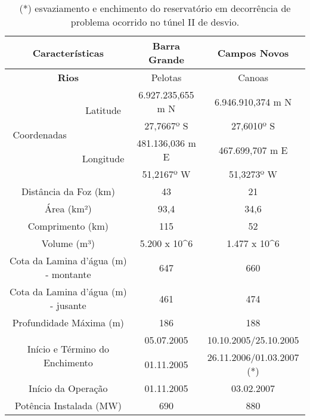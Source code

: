     \begin{table}
\centering
\begin{tabular}{|c|c|c|c|}
\hline
\multicolumn{2}{|c|}{\textbf{Características}} & \textbf{Barra Grande} & \textbf{Campos Novos} \\
\hline
\multicolumn{2}{|c|}{\textbf{Rios}} & Pelotas & Canoas \\
\hline
    \multirow{4}{*}{Coordenadas}
        & \multirow{2}{*}{Latitude}
            & 6.927.235,655 m N & 6.946.910,374 m N \\
            \cline{3-4}
            && 27,7667º S & 27,6010º S\\
            \cline{2-4}
        & \multirow{2}{*}{Longitude}
            & 481.136,036 m E & 467.699,707 m E \\
            \cline{3-4}
            && 51,2167º W & 51,3273º W \\
\hline
\multicolumn{2}{|c|}{Distância da Foz (km)} & 43 &  21 \\ \hline
\multicolumn{2}{|c|}{Área (km²)} & 93,4 &  34,6 \\ \hline
\multicolumn{2}{|c|}{Comprimento (km)} & 115 &  52 \\ \hline
\multicolumn{2}{|c|}{Volume (m³)} & 5.200 x 10^6 &  1.477 x 10^6 \\ \hline
\multicolumn{2}{|c|}{Cota da Lamina d'água (m) - montante} & 647 &  660 \\ \hline
\multicolumn{2}{|c|}{Cota da Lamina d'água (m) - jusante} & 461 &  474 \\ \hline
\multicolumn{2}{|c|}{Profundidade Máxima (m)} & 186 &  188 \\ \hline
    \multicolumn{2}{|c|}{\multirow{2}{*}{Início e Término do Enchimento}}
        & 05.07.2005 & 10.10.2005/25.10.2005 \\
        \cline{3-4}
        && 01.11.2005 & 26.11.2006/01.03.2007 (*) \\
        \hline
\multicolumn{2}{|c|}{Início da Operação} & 01.11.2005 & 03.02.2007 \\ \hline
\multicolumn{2}{|c|}{Potência Instalada (MW)} &  690 & 880 \\ \hline
\end{tabular}
\caption{(*) esvaziamento e enchimento do reservatório em decorrência de problema ocorrido no túnel II de desvio.}
\end{table}

